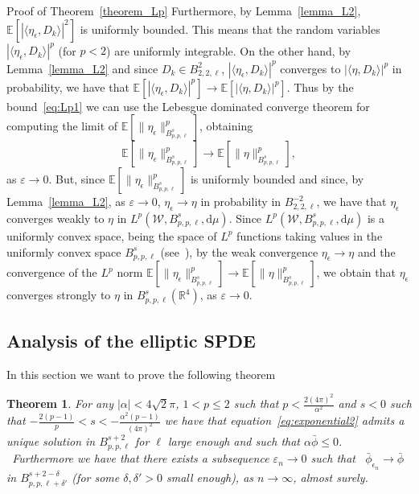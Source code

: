 \documentclass[a4paper,10pt]{article}
\newcommand{\mathd}{\mathrm{d}}
\newenvironment{proof*}[1]{\noindent\textbf{#1\ }}{\hspace*{\fill}$\Box$\medskip}
\newtheorem{theorem}{Theorem}
\begin{document}
\begin{proof*}{Proof of Theorem~\ref{theorem_Lp}}
  Furthermore, by Lemma~\ref{lemma_L2}, $\mathbb{E} [| \langle
  \eta_{\epsilon}, D_k \rangle |^2]$ is uniformly bounded. This means that the
  random variables $| \langle \eta_{\epsilon}, D_k \rangle |^p$ (for $p < 2$)
  are uniformly integrable. On the other hand, by Lemma~\ref{lemma_L2} and
  since $D_k \in B^2_{2, 2, \ell}$, $| \langle \eta_{\epsilon}, D_k \rangle
  |^p$ converges to $| \langle \eta, D_k \rangle |^p$ in probability, we have
  that $\mathbb{E} [| \langle \eta_{\epsilon}, D_k \rangle |^p] \rightarrow
  \mathbb{E} [| \langle \eta, D_k \rangle |^p]$. Thus by the
  bound~{\eqref{eq:Lp1}} we can use the Lebesgue dominated converge theorem
  for computing the limit of $\mathbb{E} [\| \eta_{\epsilon} \|_{B^s_{p, p,
  \ell}}^p]$, obtaining
  \[ \mathbb{E} [\| \eta_{\epsilon} \|_{B^s_{p, p, \ell}}^p] \rightarrow
     \mathbb{E} [\| \eta \|_{B^s_{p, p, \ell}}^p], \]
  as $\varepsilon \rightarrow 0$. But, since $\mathbb{E} [\| \eta_{\epsilon}
  \|_{B^s_{p, p, \ell}}^p]$ is uniformly bounded and since, by
  Lemma~\ref{lemma_L2}, as $\varepsilon \rightarrow 0$, $\eta_{\epsilon}
  \rightarrow \eta$ in probability in $B^{- 2}_{2, 2, \ell}$, we have that
  $\eta_{\epsilon}$ converges weakly to $\eta$ in $L^p (\mathcal{W}, B^s_{p,
  p, \ell}, \mathd \mu)$. Since $L^p (\mathcal{W}, B^s_{p, p, \ell}, \mathd
  \mu)$ is a uniformly convex space, being the space of $L^p$ functions taking
  values in the uniformly convex space $B^s_{p, p, \ell}$
  (see~{\cite{Boyko2009}}), by the weak convergence $\eta_{\epsilon}
  \rightarrow \eta$ and the convergence of the $L^p$ norm $\mathbb{E} [\|
  \eta_{\epsilon} \|_{B^s_{p, p, \ell}}^p] \rightarrow \mathbb{E} [\| \eta
  \|_{B^s_{p, p, \ell}}^p]$, we obtain that $\eta_{\epsilon}$ converges
  strongly to $\eta$ in $B^s_{p, p, \ell} (\mathbb{R}^4)$, as $\varepsilon
  \rightarrow 0$. 
\end{proof*}

\subsection{Analysis of the elliptic SPDE}\label{subsection_analytic}

In this section we want to prove the following theorem

\begin{theorem}
  \label{theorem_exponentialmain}For any $| \alpha | < 4 \sqrt{2} \pi$, $1 < p
  \leqslant 2$ such that $p < \frac{2 (4 \pi)^2}{\alpha^2}$ and $s < 0$ such
  that $- \frac{2 (p - 1)}{p} < s < - \frac{\alpha^2 (p - 1)}{(4 \pi)^2}$ we
  have that equation~{\eqref{eq:exponential2}} admits a unique solution in
  $B^{s + 2}_{p, p, \ell}$ for $\ell$ large enough and such that $\alpha
  \bar{\phi} \leqslant 0$. \ Furthermore we have that there exists a
  subsequence $\varepsilon_n \rightarrow 0$ such that \
  $\bar{\phi}_{\epsilon_n} \rightarrow \bar{\phi}$ in $B^{s + 2 - \delta}_{p,
  p, \ell + \delta'}$ (for some $\delta, \delta' > 0$ small enough), as $n
  \rightarrow \infty$, almost surely.
\end{theorem}
\end{document}
